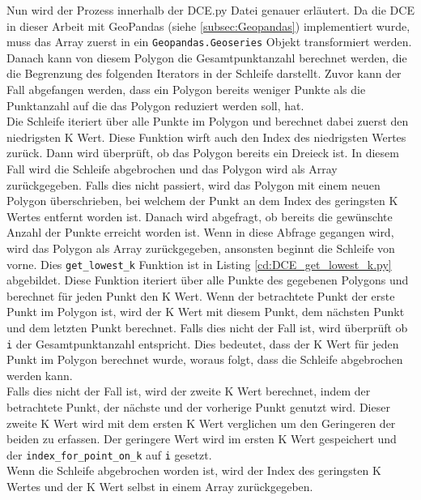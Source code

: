 {	Nun wird der Prozess innerhalb der DCE.py Datei genauer erläutert. Da die DCE in dieser Arbeit mit GeoPandas (siehe \ref{subsec:Geopandas}) implementiert wurde, muss das Array zuerst in ein \lstinline|Geopandas.Geoseries| Objekt transformiert werden. Danach kann von diesem Polygon die Gesamtpunktanzahl berechnet werden, die die Begrenzung des folgenden Iterators in der Schleife darstellt. Zuvor kann der Fall abgefangen werden, dass ein Polygon bereits weniger Punkte als die Punktanzahl auf die das Polygon reduziert werden soll, hat. \\
	
	Die Schleife iteriert über alle Punkte im Polygon und berechnet dabei zuerst den niedrigsten K Wert. Diese Funktion wirft auch den Index des niedrigsten Wertes zurück. Dann wird überprüft, ob das Polygon bereits ein Dreieck ist. In diesem Fall wird die Schleife abgebrochen und das Polygon wird als Array zurückgegeben. Falls dies nicht passiert, wird das Polygon mit einem neuen Polygon überschrieben, bei welchem der Punkt an dem Index des geringsten K Wertes entfernt worden ist. Danach wird abgefragt, ob bereits die gewünschte Anzahl der Punkte erreicht worden ist. Wenn in diese Abfrage gegangen wird, wird das Polygon als Array zurückgegeben, ansonsten beginnt die Schleife von vorne. 
	Dies \lstinline|get_lowest_k| Funktion ist in Listing \ref{cd:DCE_get_lowest_k.py} abgebildet. Diese Funktion iteriert über alle Punkte des gegebenen Polygons und berechnet für jeden Punkt den K Wert. Wenn der betrachtete Punkt der erste Punkt im Polygon ist, wird der K Wert mit diesem Punkt, dem nächsten Punkt und dem letzten Punkt berechnet. Falls dies nicht der Fall ist, wird überprüft ob \lstinline|i| der Gesamtpunktanzahl entspricht. Dies bedeutet, dass der K Wert für jeden Punkt im Polygon berechnet wurde, woraus folgt, dass die Schleife abgebrochen werden kann. \\
	Falls dies nicht der Fall ist, wird der zweite K Wert berechnet, indem der betrachtete Punkt, der nächste und der vorherige Punkt genutzt wird. Dieser zweite K Wert wird mit dem ersten K Wert verglichen um den Geringeren der beiden zu erfassen. Der geringere Wert wird im ersten K Wert gespeichert und der \lstinline|index_for_point_on_k| auf \lstinline|i| gesetzt. \\
	
	Wenn die Schleife abgebrochen worden ist, wird der Index des geringsten K Wertes und der K Wert selbst in einem Array zurückgegeben.\\

}
